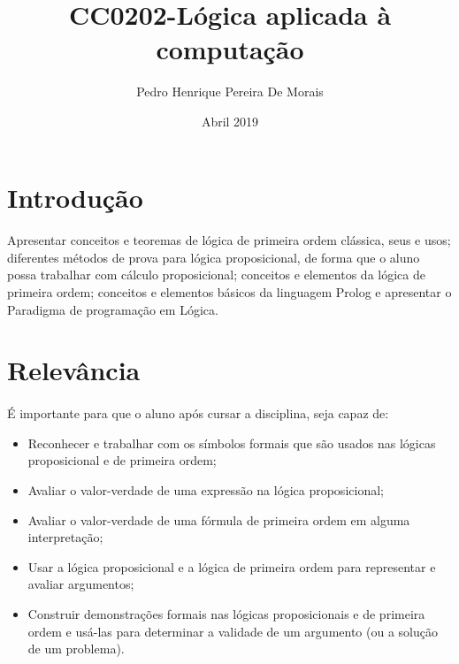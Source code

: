 ﻿\documentclass[10pt, twocolums]{article}
\title{CC0202-Lógica aplicada à computação}
\author{Pedro Henrique Pereira De Morais }
\date{Abril 2019}
\begin{document}
\maketitle

\section*{Introdução}

\paragraph{} Apresentar conceitos e teoremas de lógica de primeira ordem clássica, seus e usos; diferentes
métodos de prova para lógica proposicional, de forma que o aluno possa trabalhar com cálculo
proposicional; conceitos e elementos da lógica de primeira ordem; conceitos e elementos básicos
da linguagem Prolog e apresentar o Paradigma de programação em Lógica.
\section*{Relevância}
\paragraph{}É importante para que o aluno após cursar a disciplina, seja capaz de:
\begin{itemize}
    \item Reconhecer e trabalhar com os símbolos formais que são usados nas lógicas proposicional e de primeira ordem;
    \item Avaliar o valor-verdade de uma expressão na lógica proposicional;
    \item Avaliar o valor-verdade de uma fórmula de primeira ordem em alguma interpretação;
    \item Usar a lógica proposicional e a lógica de primeira ordem para representar e avaliar argumentos;
    \item Construir demonstrações formais nas lógicas proposicionais e de primeira ordem e usá-las para determinar a validade de um argumento (ou a solução de um problema).
\end{itemize}
\pagebreak
\end{document}
